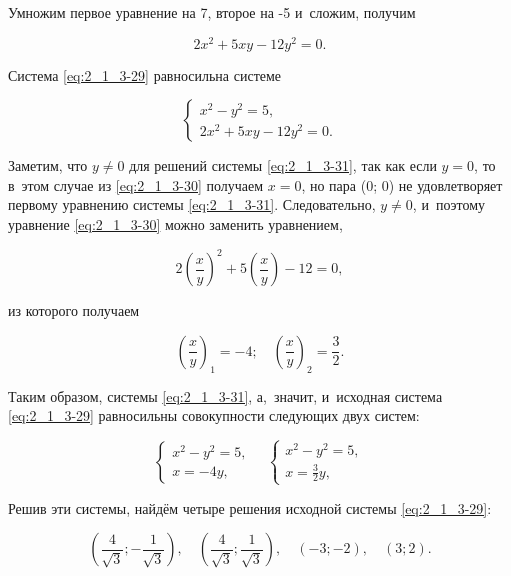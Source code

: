 Умножим первое уравнение на 7, второе на -5 и~сложим, получим

\begin{equation}\label{eq:2_1_3-30}
2x^{2} + 5xy - 12y^{2} = 0.
\end{equation}

Система \eqref{eq:2_1_3-29} равносильна системе

\begin{equation}\label{eq:2_1_3-31}
\begin{cases}
x^{2} - y^{2} = 5, \\
2x^{2} + 5xy - 12y^{2} = 0.
\end{cases}
\end{equation}

Заметим, что $y \ne 0$ для решений системы \eqref{eq:2_1_3-31},
так как если $y = 0$, то в~этом случае из \eqref{eq:2_1_3-30} получаем $x = 0$,
но пара (0; 0) не удовлетворяет первому уравнению системы \eqref{eq:2_1_3-31}.
Следовательно, $y \ne 0$, и~поэтому уравнение \eqref{eq:2_1_3-30} можно заменить уравнением,

\begin{equation}\label{eq:2_1_3-32}
\displaystyle
2\left(\frac{x}{y}\right)^{2} +
5\left(\frac{x}{y}\right) -
12
= 0,
\end{equation}

\noindent
из которого получаем

\begin{equation}\label{eq:2_1_3-33}
\displaystyle \left(\frac{x}{y}\right)_{1} = -4;
\quad
\left(\frac{x}{y}\right)_{2} = \frac{3}{2}.
\end{equation}

Таким образом, системы \eqref{eq:2_1_3-31}, а,~значит, и~исходная система \eqref{eq:2_1_3-29}
равносильны совокупности следующих двух систем:

\begin{equation*}
\begin{cases}
x^{2} - y^{2} = 5, \\
x = -4y,
\end{cases}
\quad
\begin{cases}
x^{2} - y^{2} = 5, \\
\displaystyle x = \frac{3}{2}y,
\end{cases}
\end{equation*}

Решив эти системы, найдём четыре решения исходной системы \eqref{eq:2_1_3-29}:

\begin{equation*}
\displaystyle
\left(
\frac{4}{\sqrt{3}}; -\frac{1}{\sqrt{3}}
\right), \quad
\left(
\frac{4}{\sqrt{3}}; \frac{1}{\sqrt{3}}
\right), \quad
(-3; -2), \quad
(3; 2).
\end{equation*}

